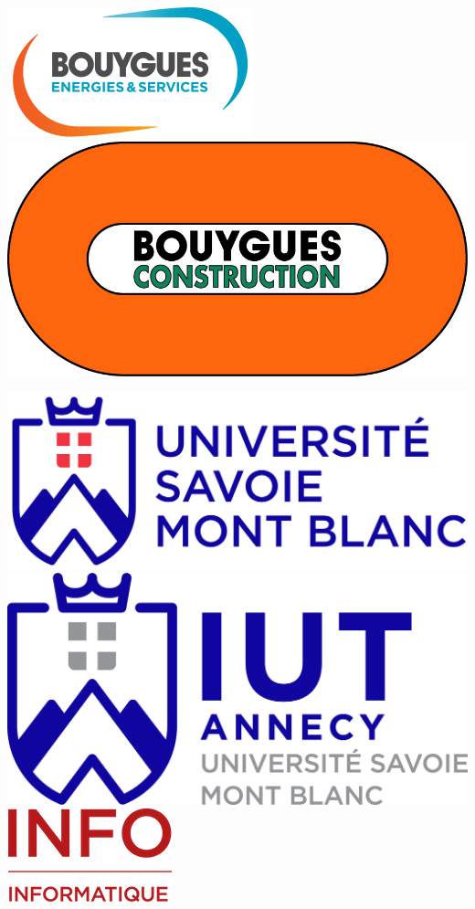 \documentclass[a4paper]{article}
\begin{document}
    \vspace{10pt}
    \begin{minipage}{.35\textwidth}
        \includegraphics[scale=0.25]{img/logobyes.png}
        \hfill
        \includegraphics[scale=0.17]{img/logo-bouygues-construction.jpg}
    \end{minipage}
    \hfill
    \begin{minipage}{.55\textwidth}
        \includegraphics[scale=0.1]{img/logo-univ.png}
        \hfill
        \includegraphics[scale=0.0425]{img/logo-iut.png}
        \hfill
        \includegraphics[scale=0.31]{img/logo-info.png}
    \end{minipage}
    
\end{document}
